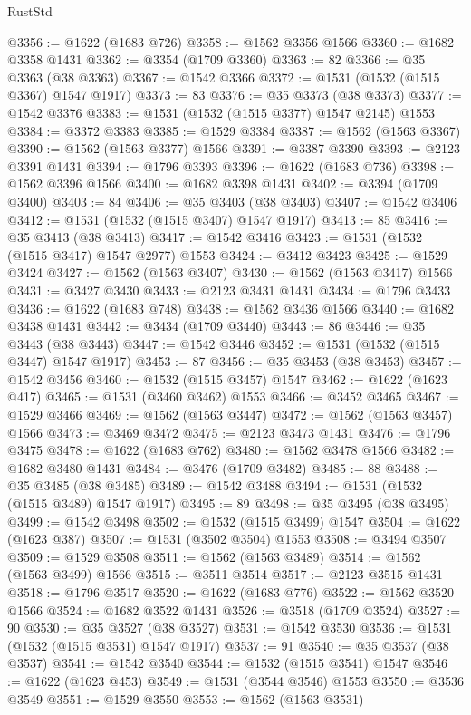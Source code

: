 \begin{lexlean}{RustStd}
\begin{coremodule}
@3356 := @1622 (@1683 @726)
@3358 := @1562 @3356 @1566
@3360 := @1682 @3358 @1431
@3362 := @3354 (@1709 @3360)
@3363 := 82
@3366 := @35 @3363 (@38 @3363)
@3367 := @1542 @3366
@3372 := @1531 (@1532 (@1515 @3367) @1547 @1917)
@3373 := 83
@3376 := @35 @3373 (@38 @3373)
@3377 := @1542 @3376
@3383 := @1531 (@1532 (@1515 @3377) @1547 @2145) @1553
@3384 := @3372 @3383
@3385 := @1529 @3384
@3387 := @1562 (@1563 @3367)
@3390 := @1562 (@1563 @3377) @1566
@3391 := @3387 @3390
@3393 := @2123 @3391 @1431
@3394 := @1796 @3393
@3396 := @1622 (@1683 @736)
@3398 := @1562 @3396 @1566
@3400 := @1682 @3398 @1431
@3402 := @3394 (@1709 @3400)
@3403 := 84
@3406 := @35 @3403 (@38 @3403)
@3407 := @1542 @3406
@3412 := @1531 (@1532 (@1515 @3407) @1547 @1917)
@3413 := 85
@3416 := @35 @3413 (@38 @3413)
@3417 := @1542 @3416
@3423 := @1531 (@1532 (@1515 @3417) @1547 @2977) @1553
@3424 := @3412 @3423
@3425 := @1529 @3424
@3427 := @1562 (@1563 @3407)
@3430 := @1562 (@1563 @3417) @1566
@3431 := @3427 @3430
@3433 := @2123 @3431 @1431
@3434 := @1796 @3433
@3436 := @1622 (@1683 @748)
@3438 := @1562 @3436 @1566
@3440 := @1682 @3438 @1431
@3442 := @3434 (@1709 @3440)
@3443 := 86
@3446 := @35 @3443 (@38 @3443)
@3447 := @1542 @3446
@3452 := @1531 (@1532 (@1515 @3447) @1547 @1917)
@3453 := 87
@3456 := @35 @3453 (@38 @3453)
@3457 := @1542 @3456
@3460 := @1532 (@1515 @3457) @1547
@3462 := @1622 (@1623 @417)
@3465 := @1531 (@3460 @3462) @1553
@3466 := @3452 @3465
@3467 := @1529 @3466
@3469 := @1562 (@1563 @3447)
@3472 := @1562 (@1563 @3457) @1566
@3473 := @3469 @3472
@3475 := @2123 @3473 @1431
@3476 := @1796 @3475
@3478 := @1622 (@1683 @762)
@3480 := @1562 @3478 @1566
@3482 := @1682 @3480 @1431
@3484 := @3476 (@1709 @3482)
@3485 := 88
@3488 := @35 @3485 (@38 @3485)
@3489 := @1542 @3488
@3494 := @1531 (@1532 (@1515 @3489) @1547 @1917)
@3495 := 89
@3498 := @35 @3495 (@38 @3495)
@3499 := @1542 @3498
@3502 := @1532 (@1515 @3499) @1547
@3504 := @1622 (@1623 @387)
@3507 := @1531 (@3502 @3504) @1553
@3508 := @3494 @3507
@3509 := @1529 @3508
@3511 := @1562 (@1563 @3489)
@3514 := @1562 (@1563 @3499) @1566
@3515 := @3511 @3514
@3517 := @2123 @3515 @1431
@3518 := @1796 @3517
@3520 := @1622 (@1683 @776)
@3522 := @1562 @3520 @1566
@3524 := @1682 @3522 @1431
@3526 := @3518 (@1709 @3524)
@3527 := 90
@3530 := @35 @3527 (@38 @3527)
@3531 := @1542 @3530
@3536 := @1531 (@1532 (@1515 @3531) @1547 @1917)
@3537 := 91
@3540 := @35 @3537 (@38 @3537)
@3541 := @1542 @3540
@3544 := @1532 (@1515 @3541) @1547
@3546 := @1622 (@1623 @453)
@3549 := @1531 (@3544 @3546) @1553
@3550 := @3536 @3549
@3551 := @1529 @3550
@3553 := @1562 (@1563 @3531)

\end{coremodule}
\end{lexlean}
